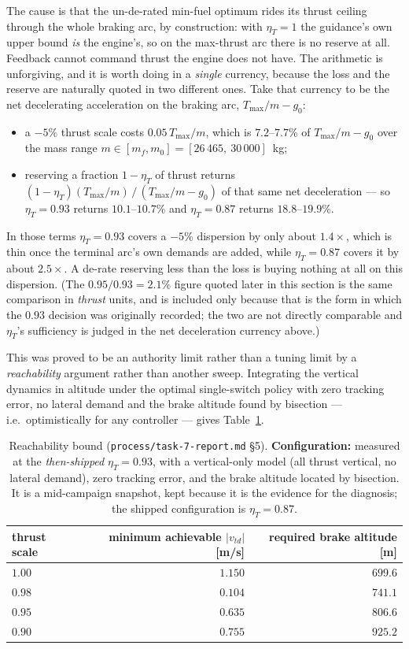 \documentclass[11pt]{article}
\newcommand{\Tmax}{T_{\max}}
\newcommand{\etaT}{\eta_T}
\begin{document}
The cause is that the un-de-rated min-fuel optimum rides its thrust ceiling
through the whole braking arc, by construction: with $\eta_T = 1$ the
guidance's own upper bound \emph{is} the engine's, so on the max-thrust arc
there is no reserve at all. Feedback cannot command thrust the engine does
not have. The arithmetic is unforgiving, and it is worth doing in a
\emph{single} currency, because the loss and the reserve are naturally
quoted in two different ones. Take that currency to be the net
decelerating acceleration on the braking arc, $\Tmax/m - g_0$:
%
\begin{itemize}
\item a $-5\%$ thrust scale costs $0.05\,\Tmax/m$, which is
$7.2$--$7.7\%$ of $\Tmax/m - g_0$ over the mass range
$m \in [m_f, m_0] = [26\,465,\ 30\,000]$~kg;
\item reserving a fraction $1 - \etaT$ of thrust returns
$(1-\etaT)(\Tmax/m)\,/\,(\Tmax/m - g_0)$ of that same net deceleration ---
so $\etaT = 0.93$ returns $10.1$--$10.7\%$ and $\etaT = 0.87$ returns
$18.8$--$19.9\%$.
\end{itemize}
%
In those terms $\etaT = 0.93$ covers a $-5\%$ dispersion by only about
$1.4\times$, which is thin once the terminal arc's own demands are added,
while $\etaT = 0.87$ covers it by about $2.5\times$. A de-rate reserving
less than the loss is buying nothing at all on this dispersion. (The
$0.95/0.93 = 2.1\%$ figure quoted later in this section is the same
comparison in \emph{thrust} units, and is included only because that is
the form in which the $0.93$ decision was originally recorded; the two are
not directly comparable and $\etaT$'s sufficiency is judged in the net
deceleration currency above.)

This was proved to be an authority limit rather than a tuning limit by a
\emph{reachability} argument rather than another sweep. Integrating the
vertical dynamics in altitude under the optimal single-switch policy with
zero tracking error, no lateral demand and the brake altitude found by
bisection --- i.e.\ optimistically for any controller --- gives
Table~\ref{tab:reach}.

\begin{table}[htbp]
\centering
\caption{Reachability bound (\texttt{process/task-7-report.md} \S5).
\textbf{Configuration:} measured at the \emph{then-shipped} $\etaT = 0.93$,
with a vertical-only model (all thrust vertical, no lateral demand), zero
tracking error, and the brake altitude located by bisection. It is a
mid-campaign snapshot, kept because it is the evidence for the diagnosis;
the shipped configuration is $\etaT = 0.87$.}
\label{tab:reach}
\begin{tabular}{lrr}
\toprule
thrust scale & minimum achievable $|v_{td}|$ [m/s] & required brake altitude [m] \\
\midrule
$1.00$ & $1.150$ & $699.6$ \\
$0.98$ & $0.104$ & $741.1$ \\
$0.95$ & $0.635$ & $806.6$ \\
$0.90$ & $0.755$ & $925.2$ \\
\bottomrule
\end{tabular}
\end{table}
\end{document}
